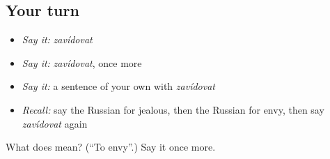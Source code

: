 \subsection*{Your turn}
\begin{itemize}
\raggedright
  \item \emph{Say it:} \emph{zavídovat}
  \item \emph{Say it:} \emph{zavídovat}, once more
  \item \emph{Say it:} a sentence of your own with \emph{zavídovat}
  \item \emph{Recall:} say the Russian for jealous, then the Russian for envy, then say \emph{zavídovat} again
\end{itemize}

\begin{tcolorbox}[breakable,colback=teal!4,colframe=teal!35!black,title={Before you move on}]
What does  mean? (\textquotedblleft{}To envy\textquotedblright{}.) Say it once more.
\end{tcolorbox}
